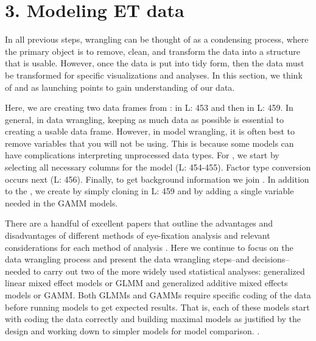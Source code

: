 \section{3. Modeling ET data}

In all previous steps, wrangling can be thought of as a condensing process, where the primary object is to remove, clean, and transform the data into a structure that is usable. However, once the data is put into tidy form, then the data must be transformed for specific visualizations and analyses. In this section, we think of  and  as launching points to gain understanding of our data. 

 Here, we are creating two data frames from :  in L: 453 and then  in L: 459. In general, in data wrangling, keeping as much data as possible is essential to creating a usable data frame. However, in model wrangling, it is often best to remove variables that you will not be using. This is because some models can have complications interpreting unprocessed data types. For , we start by selecting all necessary columns for the model (L: 454-455). Factor type conversion occurs next (L: 456). Finally, to get background information we join . In addition to the , we create  by simply cloning  in L: 459 and by adding a single variable needed in the GAMM models.



There are a handful of excellent papers that outline the advantages and disadvantages of different methods of eye-fixation analysis and relevant considerations for each method of analysis \parencite{Ito_Knoeferle_2022,Mirman_Dixon_Magnuson_2008,McMurray_2023,Barr_2008}. Here we continue to focus on the data wrangling process and present the data wrangling steps--and decisions--needed to carry out two of the more widely used statistical analyses: generalized linear mixed effect models or GLMM and generalized additive mixed effects models or GAMM. Both GLMMs and GAMMs require specific coding of the data before running models to get expected results. That is, each of these models start with coding the data correctly and building maximal models as justified by the design and working down to simpler models for model comparison. \parencite{Barr_Levy_Scheepers_Tily_2013}.

